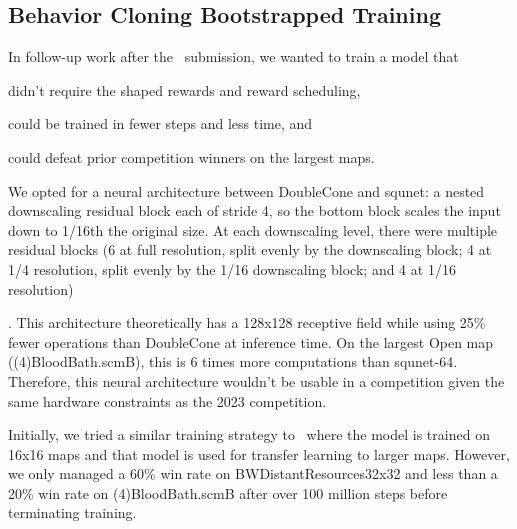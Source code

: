 \documentclass[conference]{IEEEtran}
\newif\ifsupplemental
\newcommand{\supptableref}[1]{%
  \ifsupplemental
    \ (Supplemental Table~\ref{#1})%
  \fi
}
\newcommand{\mapname}[1]{#1} %
\begin{document}
\subsection{Behavior Cloning Bootstrapped Training}
In follow-up work after the \agentName\ submission, we wanted to train a model that
\begin{inparaenum}[(1)]
    \item didn't require the shaped rewards and reward scheduling,
    \item could be trained in fewer steps and less time, and
    \item could defeat prior competition winners on the largest maps.
\end{inparaenum}
We opted for a neural architecture between DoubleCone and squnet: a nested downscaling residual
block each of stride 4, so the bottom block scales the input down to 1/16th the original
size. At each downscaling level, there were multiple residual blocks (6 at full
resolution, split evenly by the downscaling block; 4 at 1/4 resolution, split evenly by
the 1/16 downscaling block; and 4 at 1/16 resolution)\supptableref{tab:bc-architecture}. This architecture theoretically
has a 128x128 receptive field while using 25\% fewer operations than DoubleCone at inference time. On
the largest Open map (\mapname{(4)BloodBath.scmB}), this is 6 times more
computations than squnet-64. Therefore, this neural architecture wouldn't be usable in a
competition given the same hardware constraints as the 2023 competition.

Initially, we tried a similar training strategy to \agentName\ where the model is
trained on 16x16 maps and that model is used for transfer learning to
larger maps. However, we only managed a 60\% win rate on
\mapname{BWDistantResources32x32} and less than a 20\% win rate on
\mapname{(4)BloodBath.scmB} after over 100 million
steps before terminating training.
\end{document}
